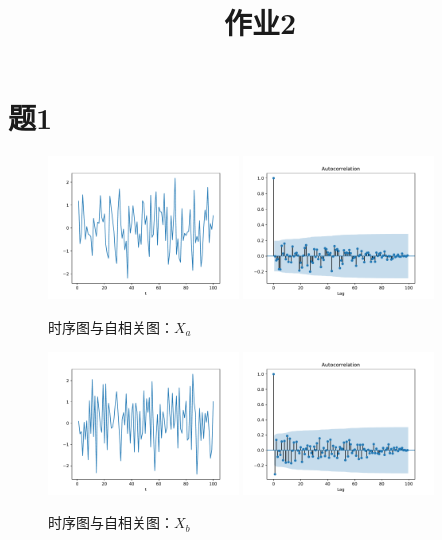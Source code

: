 \documentclass[cn]{homework}
\title{作业2}
\begin{document}
    \maketitle    

    \section{题1}
    \begin{subproblem}
        \item
        \begin{figure}[h]
            \centering
            \includegraphics[width=0.45\textwidth]{hw2/Xa.pdf}
            \includegraphics[width=0.45\textwidth]{hw2/Xa-acf.pdf}
            \caption{时序图与自相关图：$X_a$}
        \end{figure}

        \item
        \begin{figure}[h]
            \centering
            \includegraphics[width=0.45\textwidth]{hw2/Xb.pdf}
            \includegraphics[width=0.45\textwidth]{hw2/Xb-acf.pdf}
            \caption{时序图与自相关图：$X_b$}
        \end{figure}


\end{subproblem}
\end{document}
